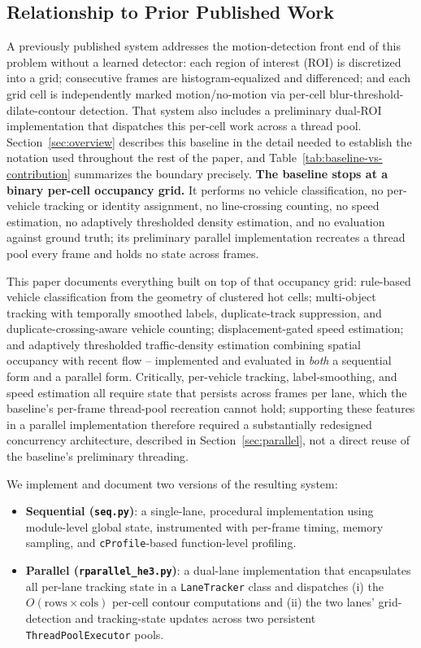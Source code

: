 \documentclass[conference]{IEEEtran}
\newcommand{\code}[1]{\texttt{#1}}
\begin{document}
\subsection{Relationship to Prior Published Work}
\label{sec:priorwork}
A previously published system \cite{baseline} addresses the motion-detection
front end of this problem without a learned detector: each region of
interest (ROI) is discretized into a grid; consecutive frames are
histogram-equalized and differenced; and each grid cell is independently
marked motion/no-motion via per-cell blur-threshold-dilate-contour
detection. That system also includes a preliminary dual-ROI
implementation that dispatches this per-cell work across a thread pool.
Section~\ref{sec:overview} describes this baseline in the detail needed
to establish the notation used throughout the rest of the paper, and
Table~\ref{tab:baseline-vs-contribution} summarizes the boundary
precisely. \textbf{The baseline stops at a binary per-cell occupancy
grid.} It performs no vehicle classification, no per-vehicle tracking
or identity assignment, no line-crossing counting, no speed estimation,
no adaptively thresholded density estimation, and no evaluation against
ground truth; its preliminary parallel implementation recreates a thread
pool every frame and holds no state across frames.

This paper documents everything built on top of that occupancy grid:
rule-based vehicle classification from the geometry of clustered hot
cells; multi-object tracking with temporally smoothed labels,
duplicate-track suppression, and duplicate-crossing-aware vehicle
counting; displacement-gated speed estimation; and adaptively
thresholded traffic-density estimation combining spatial occupancy with
recent flow -- implemented and evaluated in \emph{both} a sequential
form and a parallel form. Critically, per-vehicle tracking,
label-smoothing, and speed estimation all require state that persists
across frames per lane, which the baseline's per-frame thread-pool
recreation cannot hold; supporting these features in a parallel
implementation therefore required a substantially redesigned
concurrency architecture, described in Section~\ref{sec:parallel}, not
a direct reuse of the baseline's preliminary threading.

We implement and document two versions of the resulting system:

\begin{itemize}
\item \textbf{Sequential (\code{seq.py})}: a single-lane, procedural
implementation using module-level global state, instrumented with
per-frame timing, memory sampling, and \code{cProfile}-based
function-level profiling.
\item \textbf{Parallel (\code{rparallel\_he3.py})}: a dual-lane
implementation that encapsulates all per-lane tracking state in a
\code{LaneTracker} class and dispatches (i) the $O(\text{rows}\times
\text{cols})$ per-cell contour computations and (ii) the two lanes'
grid-detection and tracking-state updates across two persistent
\code{ThreadPoolExecutor} pools.
\end{itemize}
\end{document}
